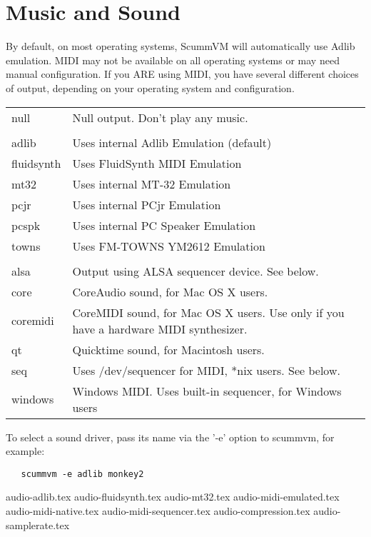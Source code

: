 

\section{Music and Sound} \label{sect-music-and-sound}
By default, on most operating systems, ScummVM will automatically use Adlib
emulation. MIDI may not be available on all operating systems or may need
manual configuration. If you ARE using MIDI, you have several different
choices of output, depending on your operating system and configuration.

\begin{tabular}[h]{ll}
  null       & Null output. Don't play any music.\\
             & \\
  adlib      & Uses internal Adlib Emulation (default)\\
  fluidsynth & Uses FluidSynth MIDI Emulation\\
  mt32       & Uses internal MT-32 Emulation\\
  pcjr       & Uses internal PCjr Emulation \\
  pcspk      & Uses internal PC Speaker Emulation\\
  towns      & Uses FM-TOWNS YM2612 Emulation\\
             & \\
  alsa       & Output using ALSA sequencer device. See below.\\
  core       & CoreAudio sound, for Mac OS X users.\\
  coremidi   & CoreMIDI sound, for Mac OS X users. Use only if you have a hardware MIDI synthesizer.\\
  qt         & Quicktime sound, for Macintosh users.\\
  seq        & Uses /dev/sequencer for MIDI, *nix users. See below.\\
  windows    & Windows MIDI. Uses built-in sequencer, for Windows users\\
\end{tabular}

To select a sound driver, pass its name via the '-e' option to scummvm,
for example:
\begin{verbatim}
   scummvm -e adlib monkey2
\end{verbatim}

 {audio-adlib.tex}
 {audio-fluidsynth.tex}
 {audio-mt32.tex}
 {audio-midi-emulated.tex}
 {audio-midi-native.tex}
 {audio-midi-sequencer.tex}
 {audio-compression.tex}
 {audio-samplerate.tex}
